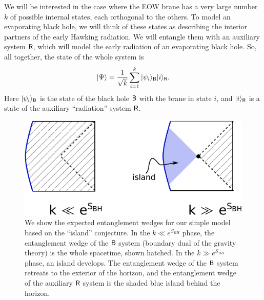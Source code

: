 \documentclass[11pt]{article}
\newcommand{\be}{\begin{equation}}
\newcommand{\ee}{\end{equation}}
\numberwithin{equation}{section}
\begin{document}
We will be interested in the case where the EOW brane has a very large number $k$ of possible internal states, each orthogonal to the others. To model an evaporating black hole, we will think of these states as describing the interior partners of the early Hawking radiation. We will entangle them with an auxiliary system $\sf{R}$, which will model the early radiation of an evaporating black hole. So, all together, the state of the whole system is
\be
|\Psi\rangle = \frac{1}{\sqrt{k}}\sum_{i = 1}^k |\psi_i\rangle_{\sf{B}}|i\rangle_{\sf{R}}.\label{StateWholeSystem}
\ee
Here $|\psi_i\rangle_{\sf{B}}$ is the state of the black hole $\sf{B}$ with the brane in state $i$, and $|i\rangle_{\sf{R}}$ is a state of the auxiliary ``radiation'' system $\sf{R}$.
\begin{figure}[t]
\begin{center}
\includegraphics[scale = .95]{images/2.pdf}
\caption{{\small We show the expected entanglement wedges for our simple model based on the ``island'' conjecture. In the $k \ll e^{S_{BH}}$ phase, the entanglement wedge of the $\sf{B}$ system (boundary dual of the gravity theory) is the whole spacetime, shown hatched. In the $k \gg e^{S_{BH}}$ phase, an island develops. The entanglement wedge of the $\sf{B}$ system retreats to the exterior of the horizon, and the entanglement wedge of the auxiliary $\sf{R}$ system is the shaded blue island behind the horizon.}}\label{fig2}
\end{center}
\end{figure}
\end{document}
